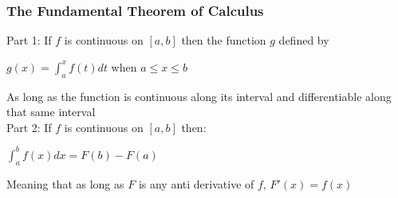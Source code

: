 \documentclass[10pt,a4paper]{article}
\begin{document}
	\subsubsection{The Fundamental Theorem of Calculus}
	Part 1: If $f$ is continuous on $[a,b]$ then the function $g$ defined by
	\begin{center}
		$g(x) = \int_{a}^{x}{f(t)dt}$ when $a \leq x \leq b$
	\end{center}
	As long as the function is continuous along its interval and differentiable along that same interval
	\\		Part 2: If $f$ is continuous on $[a,b]$ then: 
	\begin{center}
		$\int_{a}^{b}{f(x)dx} = F(b) - F(a)$
	\end{center}
	Meaning that as long as $F$ is any anti derivative of $f$, $F'(x) = f(x)$
\end{document}
